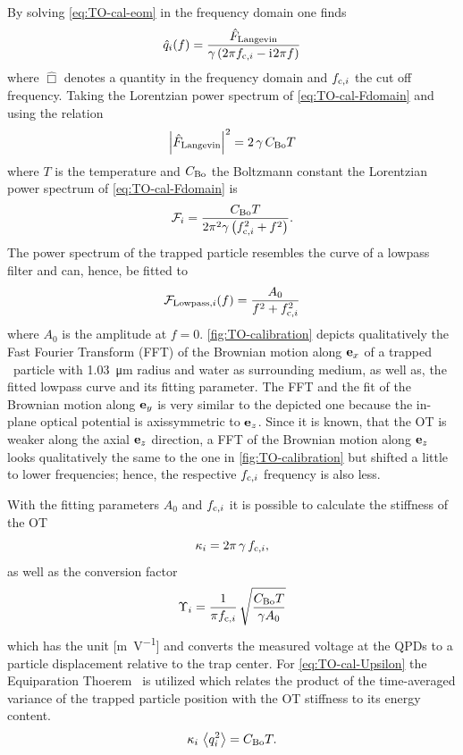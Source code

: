 By solving \cref{eq:TO-cal-eom} in the frequency domain one finds
\begin{equation}
  \hat{q}_{i}(f) = \frac{\hat{F}_{\mathrm{Langevin}}}{\gamma\left( 2\pi f_{\mathrm{c},i} - 
  \mathrm{i}\mkern1mu 2\pi f \right)}
  \label{eq:TO-cal-Fdomain}
\end{equation}
where $\hat{\Box}$ denotes a quantity in the frequency domain and $f_{\mathrm{c},i}$ the 
cut off frequency. Taking the Lorentzian power spectrum of 
\cref{eq:TO-cal-Fdomain} and using the relation
\begin{equation}
  \abs{\hat{F}_{\mathrm{Langevin}}}^{2} = 2\,\gamma\,C_{\mathrm{Bo}}T
\end{equation}
where $T$ is the temperature and $C_{\mathrm{Bo}}$ the Boltzmann constant the 
Lorentzian power spectrum of \cref{eq:TO-cal-Fdomain} is~\cite{Lamprecht2017}
\begin{equation}
  \mathcal{F}_{i}=\frac{C_{\mathrm{Bo}}T}{2\pi^{2}\gamma\left( f_{\mathrm{c},i}^{2}+ f^{2} 
  \right)}.
\end{equation}
The power spectrum of the trapped particle resembles the curve of a lowpass 
filter and can, hence, be fitted to
\begin{equation}
  \mathcal{F}_{\mathrm{Lowpass},i}(f) = \frac{A_{0}}{f^{2} + f_{\mathrm{c},i}^{2}}
\end{equation}
where $A_{0}$ is the amplitude at $f=0$. \cref{fig:TO-calibration} depicts 
qualitatively the Fast Fourier Transform (FFT) of the Brownian motion along 
$\vb{e}_{x}$ of a trapped \SiO~particle with \SI{1.03}{\um} radius and water as 
surrounding medium, as well as, the fitted lowpass curve and its fitting 
parameter. The FFT and the fit of the Brownian motion along $\vb{e}_{y}$ is very 
similar to the depicted one because the in-plane optical potential is 
axissymmetric to $\vb{e}_{z}$. Since it is known, that the OT is weaker along the 
axial $\vb{e}_{z}$ direction, a FFT of the Brownian motion along $\vb{e}_{z}$ looks 
qualitatively the same to the one in \cref{fig:TO-calibration} but shifted a 
little to lower frequencies; hence, the respective $f_{\mathrm{c},i}$ frequency is also 
less.

With the fitting parameters $A_{0}$ and $f_{\mathrm{c},i}$ it is possible to calculate 
the stiffness of the OT~\cite{Lamprecht2017}
\begin{equation}
  \kappa_{i} = 2\pi\,\gamma\,f_{\mathrm{c},i},
\end{equation}
as well as the conversion factor
\begin{equation}
  \Upsilon_{i} = \frac{1}{\pi f_{\mathrm{c},i}}\,
  \sqrt{\frac{C_{\mathrm{Bo}}T}{\gamma A_{0}}}
  \label{eq:TO-cal-Upsilon}
\end{equation}
which has the unit [\si{\meter\per\volt}] and converts the measured voltage at 
the QPDs to a particle displacement relative to the trap center. For 
\cref{eq:TO-cal-Upsilon} the Equiparation Thoerem~\cite{Wang1945} is utilized 
which relates the product of the time-averaged variance of the trapped particle 
position with the OT stiffness to its energy content.
\begin{equation}
  \kappa_{i}\,\left\langle q_{i}^{2} \right\rangle = C_{\mathrm{Bo}}T.
\end{equation}

